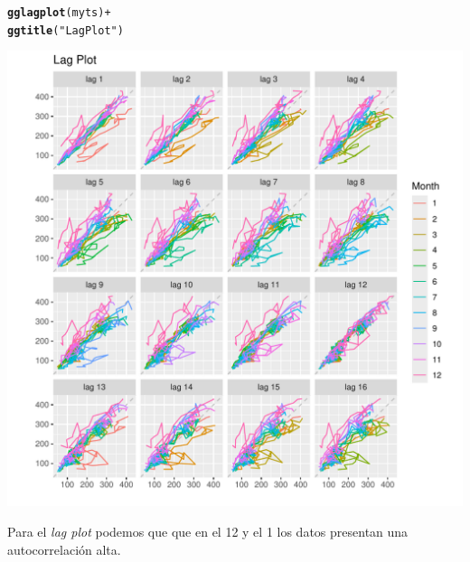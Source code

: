 \documentclass[12pt]{article}\usepackage[]{graphicx}\usepackage[]{xcolor}
\makeatletter
\def\maxwidth{ %
  \ifdim\Gin@nat@width>\linewidth
    \linewidth
  \else
    \Gin@nat@width
  \fi
}
\newcommand{\hlsng}[1]{\textcolor[rgb]{0.192,0.494,0.8}{#1}}%
\newcommand{\hlopt}[1]{\textcolor[rgb]{0,0,0}{#1}}%
\newcommand{\hldef}[1]{\textcolor[rgb]{0.345,0.345,0.345}{#1}}%
\newcommand{\hlkwd}[1]{\textcolor[rgb]{0.737,0.353,0.396}{\textbf{#1}}}%
\newenvironment{kframe}{%
 \def\at@end@of@kframe{}%
 \ifinner\ifhmode%
  \def\at@end@of@kframe{\end{minipage}}%
  \begin{minipage}{\columnwidth}%
 \fi\fi%
 \def\FrameCommand##1{\hskip\@totalleftmargin \hskip-\fboxsep
 \colorbox{shadecolor}{##1}\hskip-\fboxsep
     \hskip-\linewidth \hskip-\@totalleftmargin \hskip\columnwidth}%
 \MakeFramed {\advance\hsize-\width
   \@totalleftmargin\z@ \linewidth\hsize
   \@setminipage}}%
 {\par\unskip\endMakeFramed%
 \at@end@of@kframe}
\newenvironment{knitrout}{}{} %
\makeatother
\begin{document}
\begin{knitrout}
\color{fgcolor}\begin{kframe}
\begin{alltt}
\hlkwd{gglagplot}\hldef{(myts)} \hlopt{+}
  \hlkwd{ggtitle}\hldef{(}\hlsng{"Lag Plot"}\hldef{)}
\end{alltt}
\end{kframe}

{\centering \includegraphics[width=\maxwidth]{figure/unnamed-chunk-5-1} 

}


\end{knitrout}


Para el \textit{lag plot} podemos que que en el 12 y el 1 los datos presentan una autocorrelación alta.
\end{document}
